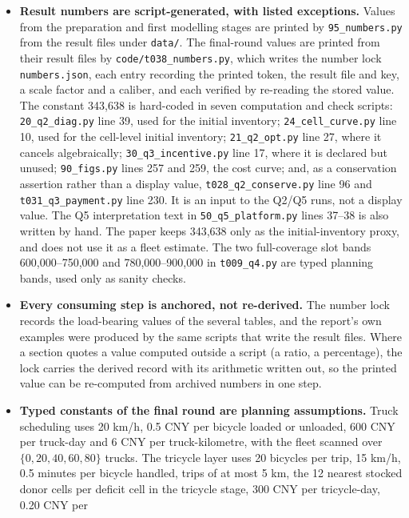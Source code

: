 \begin{itemize}[leftmargin=1.4em]
\item \textbf{Result numbers are script-generated, with listed exceptions.} Values
  from the preparation and first modelling stages are printed by
  \texttt{95\_numbers.py} from the result files under \texttt{data/}. The final-round
  values are printed from their result files by \texttt{code/t038\_numbers.py},
  which writes the number lock \texttt{numbers.json}, each entry recording the printed
  token, the result file and key, a scale factor and a caliber, and each verified by
  re-reading the stored value. The constant 343{,}638
  is hard-coded in seven computation and check scripts:
  \texttt{20\_q2\_diag.py} line 39, used for the initial inventory;
  \texttt{24\_cell\_curve.py} line 10, used for the cell-level initial inventory;
  \texttt{21\_q2\_opt.py} line 27, where it cancels algebraically;
  \texttt{30\_q3\_incentive.py} line 17, where it is declared but unused;
  \texttt{90\_figs.py} lines 257 and 259, the cost curve; and,
  as a conservation assertion rather than a display value,
  \texttt{t028\_q2\_conserve.py} line 96 and \texttt{t031\_q3\_payment.py} line 230.
  It is an input to the Q2/Q5 runs, not a display value. The Q5 interpretation text in
  \texttt{50\_q5\_platform.py} lines 37--38 is also written by hand. The paper
  keeps 343{,}638 only as the initial-inventory proxy, and does not use it as a
  fleet estimate. The two full-coverage slot bands 600,000--750,000 and
  780,000--900,000 in \texttt{t009\_q4.py} are typed planning bands, used only as
  sanity checks.
\item \textbf{Every consuming step is anchored, not re-derived.} The number lock
  records the load-bearing values of the several tables, and the report's own
  examples were produced by the same scripts that write the result files. Where a
  section quotes a value computed outside a script (a ratio, a percentage), the
  lock carries the derived record with its arithmetic written out, so the printed
  value can be re-computed from archived numbers in one step.
\item \textbf{Typed constants of the final round are planning assumptions.} Truck
  scheduling uses 20 km/h, 0.5 CNY per bicycle loaded or unloaded, 600 CNY per
  truck-day and 6 CNY per truck-kilometre, with the fleet scanned over
  $\{0,20,40,60,80\}$ trucks. The tricycle layer uses 20 bicycles per trip, 15 km/h,
  0.5 minutes per bicycle handled, trips of at most 5 km, the 12 nearest stocked donor
  cells per deficit cell in the tricycle stage, 300 CNY per tricycle-day, 0.20 CNY per

\end{itemize}

